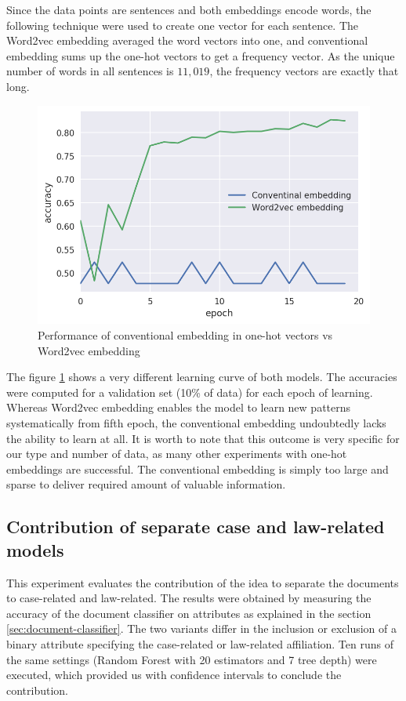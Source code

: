 \documentclass[
  digital, %
  notable,   %
  nolof,     %
  nolot,     %
]{fithesis3}
\begin{document}
Since the data points are sentences and both embeddings encode words, the following technique were used to create one vector for each sentence.
The Word2vec embedding averaged the word vectors into one, and conventional embedding sums up the one-hot vectors to get a frequency vector.
As the unique number of words in all sentences is $11,019$, the frequency vectors are exactly that long.

\begin{figure}[h]
\caption{Performance of conventional embedding in one-hot vectors vs Word2vec embedding}
\label{fig:eval_word2vec_contribution}
\includegraphics[width=\textwidth]{img/eval_word2vec_contribution}
\end{figure}

The figure \ref{fig:eval_word2vec_contribution} shows a very different learning curve of both models.
The accuracies were computed for a validation set (10\% of data) for each epoch of learning.
Whereas Word2vec embedding enables the model to learn new patterns systematically from fifth epoch, the conventional embedding undoubtedly lacks the ability to learn at all.
It is worth to note that this outcome is very specific for our type and number of data, as many other experiments with one-hot embeddings are successful.  
The conventional embedding is simply too large and sparse to deliver required amount of valuable information.


\subsection{Contribution of separate case and law-related models}
\label{sec:eval_law_case_contribution}
This experiment evaluates the contribution of the idea to separate the documents to case-related and law-related.
The results were obtained by measuring the accuracy of the document classifier on attributes as explained in the section \ref{sec:document-classifier}.
The two variants differ in the inclusion or exclusion of a binary attribute specifying the case-related or law-related affiliation.
Ten runs of the same settings (Random Forest with 20 estimators and 7 tree depth) were executed, which provided us with confidence intervals to conclude the contribution.
\end{document}
